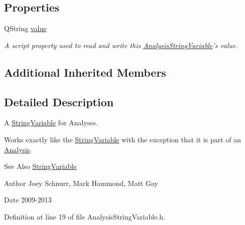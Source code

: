 \subsection*{Properties}
\begin{DoxyCompactItemize}
\item 
\hypertarget{class_picto_1_1_analysis_string_variable_a4b85dfe0385a670c4043ffac1a353041}{Q\-String \hyperlink{class_picto_1_1_analysis_string_variable_a4b85dfe0385a670c4043ffac1a353041}{value}}\label{class_picto_1_1_analysis_string_variable_a4b85dfe0385a670c4043ffac1a353041}

\begin{DoxyCompactList}\small\item\em A script property used to read and write this \hyperlink{class_picto_1_1_analysis_string_variable}{Analysis\-String\-Variable}'s value. \end{DoxyCompactList}\end{DoxyCompactItemize}
\subsection*{Additional Inherited Members}


\subsection{Detailed Description}
A \hyperlink{class_picto_1_1_string_variable}{String\-Variable} for Analyses. 

Works exactly like the \hyperlink{class_picto_1_1_string_variable}{String\-Variable} with the exception that it is part of an \hyperlink{class_picto_1_1_analysis}{Analysis}. \begin{DoxySeeAlso}{See Also}
\hyperlink{class_picto_1_1_string_variable}{String\-Variable} 
\end{DoxySeeAlso}
\begin{DoxyAuthor}{Author}
Joey Schnurr, Mark Hammond, Matt Gay 
\end{DoxyAuthor}
\begin{DoxyDate}{Date}
2009-\/2013 
\end{DoxyDate}


Definition at line 19 of file Analysis\-String\-Variable.\-h.



